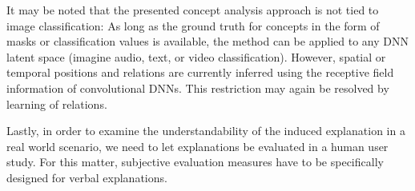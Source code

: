 It may be noted that the presented concept analysis approach is not
tied to image classification: 
As long as the ground truth for concepts in the form of masks or
classification values is available, the method can be applied to any
DNN latent space
(imagine \forexample audio, text, or video classification).
However, spatial or temporal positions and relations are currently
inferred using the receptive field information of convolutional DNNs.
This restriction may again be resolved by learning of relations.

Lastly, in order to examine the understandability of the induced
explanation in a real world scenario, we need to let explanations be
evaluated in a human user study. For this matter, subjective
evaluation measures have to be specifically designed for verbal
explanations.


